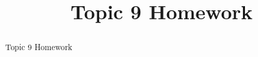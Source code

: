 \documentclass{xourse}
\title{Topic 9 Homework}
\begin{document}
\begin{abstract}
Topic 9 Homework
\end{abstract}
\maketitle

%


\end{document}
